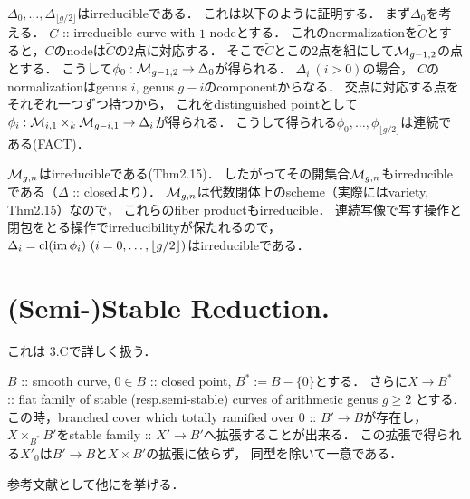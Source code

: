 \documentclass[a4paper]{jsarticle}
\begin{document}
    $\Delta_0,\dots,\Delta_{\lfloor g/2 \rfloor}$はirreducibleである．
    これは以下のように証明する．
    まず$\Delta_0$を考える．
    $C$ :: irreducible curve with $1$ nodeとする．
    これのnormalizationを$\tilde{C}$とすると，$C$のnodeは$\tilde{C}$の$2$点に対応する．
    そこで$\tilde{C}$とこの$2$点を組にして$\mathcal{M}_{g-1,2}$の点とする．
    こうして$\phi_0: \mathcal{M}_{g-1, 2} \to \Delta_0$が得られる．
    $\Delta_i \ (i>0)$の場合，
    $C$のnormalizationはgenus $i$, genus $g-i$のcomponentからなる．
    交点に対応する点をそれぞれ一つずつ持つから，
    これをdistinguished pointとして
    $\phi_i: \mathcal{M}_{i, 1} \times_k \mathcal{M}_{g-i, 1} \to \Delta_i$が得られる．
    こうして得られる$\phi_0,\dots,\phi_{\lfloor g/2 \rfloor}$は連続である(FACT)．
    
    $\overline{\mathcal{M}}_{g,n}$はirreducibleである(Thm2.15)．
    したがってその開集合$\mathcal{M}_{g,n}$もirreducibleである（$\Delta$ :: closedより）．
    $\mathcal{M}_{g,n}$は代数閉体上のscheme（実際にはvariety, Thm2.15）なので，
    これらのfiber productもirreducible．
    連続写像で写す操作と閉包をとる操作でirreducibilityが保たれるので，
    $\Delta_i=\operatorname{cl}(\operatorname{im} \phi_i) \ (i=0,\dots,\lfloor g/2 \rfloor)$はirreducibleである．

\section{(Semi-)Stable Reduction.}
    これは\cite{HaMo} 3.Cで詳しく扱う．

\begin{Thm}
    $B$ :: smooth curve, $0 \in B$ :: closed point, $B^*:=B-\{0\}$とする．
    さらに$X \to B^*$ :: flat family of stable (resp.semi-stable) curves of arithmetic genus $g \geq 2$
    とする.
    この時，branched cover which totally ramified over $0$ :: $B' \to B$が存在し，
    $X \times_{B^*} B'$をstable family :: $X' \to B'$へ拡張することが出来る．
    この拡張で得られる$X'_{0}$は$B' \to B$と$X \times B'$の拡張に依らず，
    同型を除いて一意である．
\end{Thm}
    参考文献として他に\cite{TourStableRed}を挙げる．



\end{document}
